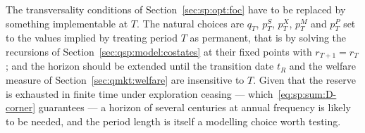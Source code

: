  The transversality conditions of Section~\ref{sec:sp:opt:foc} have to
be replaced by something implementable at $T$. The natural choices are $q_T$, $p^S_T$, $p^X_T$, $p^M_T$
and $p^P_T$ set to the values implied by treating period $T$ as permanent, that is by solving the
recursions of Section~\ref{sec:qsp:model:costates} at their fixed points with $r_{T+1}=r_T$; and the
horizon should be extended until the transition date $t_R$ and the welfare measure of
Section~\ref{sec:qmkt:welfare} are insensitive to $T$. Given that the reserve is exhausted in finite
time under exploration ceasing --- which~\eqref{eq:sp:sum:D-corner} guarantees --- a horizon of several
centuries at annual frequency is likely to be needed, and the period length is itself a modelling
choice worth testing.
